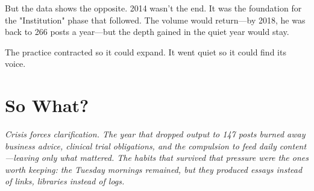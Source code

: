 But the data shows the opposite. 2014 wasn't the end. It was the foundation for the "Institution" phase that followed. The volume would return---by 2018, he was back to 266 posts a year---but the depth gained in the quiet year would stay.

The practice contracted so it could expand. It went quiet so it could find its voice.

\bigskip

\section*{So What?}

\textit{Crisis forces clarification. The year that dropped output to 147 posts burned away business advice, clinical trial obligations, and the compulsion to feed daily content---leaving only what mattered. The habits that survived that pressure were the ones worth keeping: the Tuesday mornings remained, but they produced essays instead of links, libraries instead of logs.}
